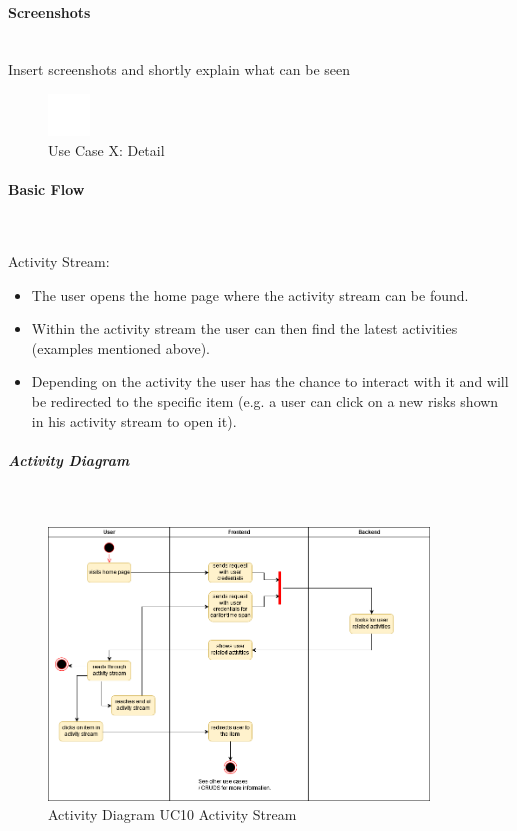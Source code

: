 \paragraph*{Screenshots}\mbox{}\\
Insert screenshots and shortly explain what can be seen
\begin{figure}[h] 
	\centering
	\includegraphics[width=0.1\textwidth]{Content/Domain/placeholder.png}
	\caption{Use Case X: Detail}
	\label{fig:label1}
\end{figure}

\paragraph*{Basic Flow} \mbox{}\\


\noindent
Activity Stream: 
\begin{itemize}
	\vspace{-3mm}
	\setlength\itemsep{-1em}
	\item The user opens the home page where the activity stream can be found.
	\item Within the activity stream the user can then find the latest activities (examples mentioned above).
	\item Depending on the activity the user has the chance to interact with it and will be redirected to the specific item (e.g. a user can click on a new risks shown in his activity stream to open it).
\end{itemize} 


\newpage
\subparagraph{Activity Diagram}\mbox{}\\
\begin{figure}[h]
	\centering
	\includegraphics[width=0.9\textwidth]{Content/Domain/UC10ActivityStream.png}
	\caption{Activity Diagram \ac{UC}10 Activity Stream}
	\label{fig:label11}
\end{figure}

